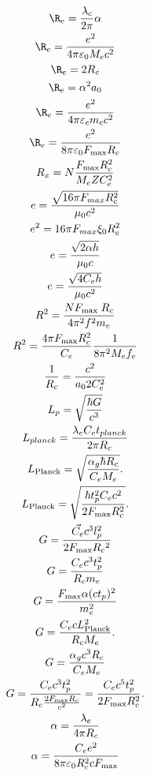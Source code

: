     \begin{gather*}
        \R_e = \frac{\lambda_c}{2 \pi} \alpha\\
        \R_e = \frac{e^2}{4 \pi \varepsilon_0 M_e c^2}\\
        \R_e = 2 R_c\\
        \R_e =  \alpha^2 a_0\\
        \R_e = \frac{e^2}{4 \pi \varepsilon_c m_c c^2}\\
        \R_e = \frac{e^2}{8 \pi \varepsilon_0 F_{\text{max}} R_c}\\
        R_x = N \frac{F_{\max} R_c^2}{M_e Z C_e^2}\\
        e=\frac{\sqrt{16 \pi F_{max} R_c^2}}{\mu_0 c^2}\\
        e^2=16 \pi F_{max} \xi_0 R_e^2\\
        e=\frac{\sqrt{2 \alpha h}}{\mu_0 c}\\
        e = \frac{\sqrt{4 C_e h}}{\mu_0 c^2}\\
        R^2 = \frac{N F_{\text {max }} R_c}{4 \pi^2 f^2 m_e}\\
        R^2 = \frac{4 \pi F_{\text{max}} R_c^2}{C_e} \frac{1}{8 \pi^2 M_e f_e}\\
        \frac{1}{R_c} = \frac{c^2}{a_0 2 C_e^2}\\
        {L_p}=\sqrt{\frac{\hbar G}{c^3}}\\
        L_{planck} = \frac{\lambda_e C_e t_{planck}}{2 \pi R_c}\\
        L_{\text{Planck}} = \sqrt{\frac{\alpha_g \hbar R_c}{C_e M_e}}.\\
        L_{\text{Planck}} = \sqrt{\frac{\hbar t_p^2 C_e c^2}{2 F_{\text{max}} R_c^2}}.\\
        G =\frac{\vec{C_e} c^3 l_p^2}{2 F_{\max } R_c{ }^2}\\
        G=\frac{C_e c^3 t_p^2}{R_c m_e}\\
        G=\frac{F_{\operatorname{max}} \alpha (c t_p)^2}{m_e^2}\\
        G = \frac{C_e c L_{\text{Planck}}^2}{R_c M_e}.\\
        G = \frac{\alpha_g c^3 R_c}{C_e M_e}\\
        G = \frac{C_e c^3 t_p^2}{R_c \frac{2 F_{\text{max}} R_c}{c^2}} = \frac{C_e c^5 t_p^2}{2 F_{\text{max}} R_c^2}.\\
        \alpha = \frac{\lambda_e}{4 \pi R_c}\\
        \alpha = \frac{C_e e^2}{8 \pi \varepsilon_0 R_c^2 c F_{\text{max}}}\\

\end{gather*}
